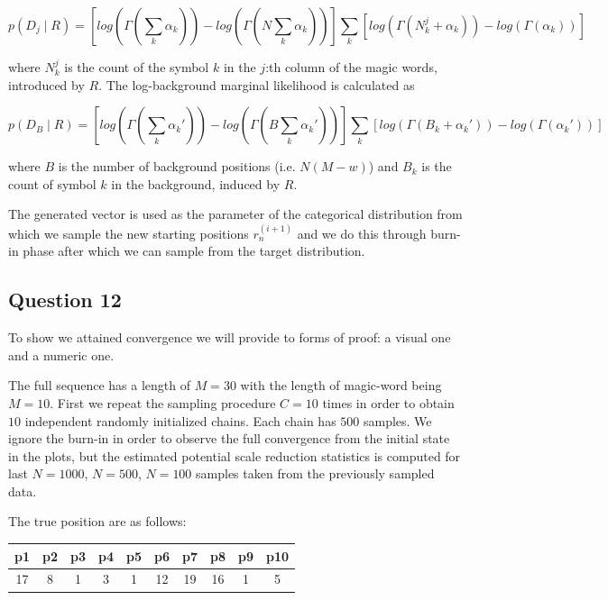 \documentclass[]{article}
\begin{document}
$$ p(D_j \mid R) = \left[log\left(\Gamma(\sum_k \alpha_k) \right) - log\left(\Gamma(N \sum_k \alpha_k)\right) \right] \sum_k \left[ log\left(\Gamma( N_k^j + \alpha_k)\right) - log\left(\Gamma(\alpha_k)\right) \right] $$

where $N_k^j$ is the count of the symbol $k$ in the $j$:th column of the magic words, introduced by $R$. The log-background marginal likelihood is calculated as

$$ p(D_B \mid R) = \left[ log\left(\Gamma(\sum_k \alpha_k') \right) - log\left(\Gamma(B \sum_k \alpha_k')\right) \right] \sum_k \left[ log\left(\Gamma( B_k + \alpha_k')\right) - log\left(\Gamma(\alpha_k') \right) \right] $$

where $B$ is the number of background positions (i.e. $N(M-w)$) and $B_k$ is the count of symbol $k$ in the background, induced by $R$.


The generated vector is used as the parameter of the categorical distribution from which we sample the new starting positions $r_n^{(i+1)}$ and we do this through burn-in phase after which we can sample from the target distribution.

\subsection*{Question 12}

To show we attained convergence we will provide to forms of proof: a visual one and a numeric one. 

The full sequence has a length of $M=30$ with the length of magic-word being $M=10$. First we repeat the sampling procedure $C=10$ times in order to obtain $10$ independent randomly initialized chains. Each chain has $500$ samples. We ignore the burn-in in order to observe the full convergence from the initial state in the plots, but the estimated potential scale reduction statistics is computed for last $N=1000$, $N=500$, $N=100$ samples taken from the previously sampled data. 

The true position are as follows:

\begin{center}
	\begin{tabular}{||c c c c c c c c c c||} 
		\hline
		p1 & p2 & p3 & p4 & p5 & p6 & p7 & p8 & p9 & p10 \\ [0.5ex] 
		\hline\hline
		17 & 8 & 1 & 3 & 1 & 12 & 19 & 16 & 1 & 5 \\ [1ex]
		\hline
	\end{tabular}
\end{center}
\end{document}
